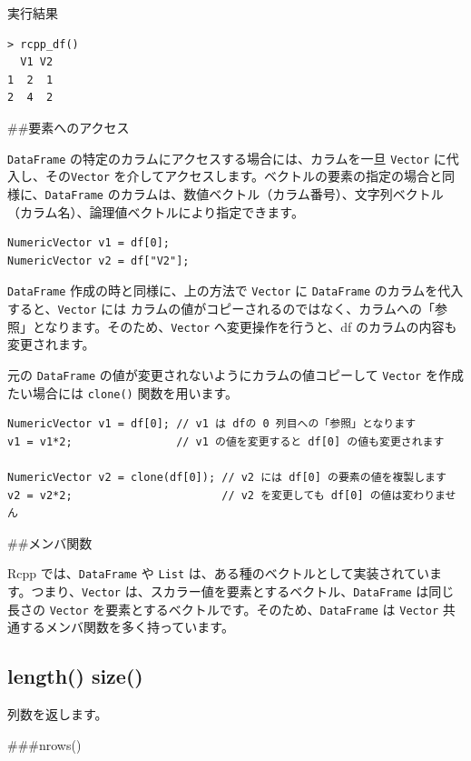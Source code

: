 \documentclass[]{book}
\begin{document}
実行結果

\begin{verbatim}
> rcpp_df()
  V1 V2
1  2  1
2  4  2
\end{verbatim}

\#\#要素へのアクセス

\texttt{DataFrame} の特定のカラムにアクセスする場合には、カラムを一旦 \texttt{Vector} に代入し、その\texttt{Vector} を介してアクセスします。ベクトルの要素の指定の場合と同様に、\texttt{DataFrame} のカラムは、数値ベクトル（カラム番号）、文字列ベクトル（カラム名）、論理値ベクトルにより指定できます。

\begin{verbatim}
NumericVector v1 = df[0];
NumericVector v2 = df["V2"];
\end{verbatim}

\texttt{DataFrame} 作成の時と同様に、上の方法で \texttt{Vector} に \texttt{DataFrame} のカラムを代入すると、\texttt{Vector} には カラムの値がコピーされるのではなく、カラムへの「参照」となります。そのため、\texttt{Vector} へ変更操作を行うと、df のカラムの内容も変更されます。

元の \texttt{DataFrame} の値が変更されないようにカラムの値コピーして \texttt{Vector} を作成たい場合には \texttt{clone()} 関数を用います。

\begin{verbatim}
NumericVector v1 = df[0]; // v1 は dfの 0 列目への「参照」となります
v1 = v1*2;                // v1 の値を変更すると df[0] の値も変更されます

NumericVector v2 = clone(df[0]); // v2 には df[0] の要素の値を複製します
v2 = v2*2;                       // v2 を変更しても df[0] の値は変わりません
\end{verbatim}

\#\#メンバ関数

Rcpp では、\texttt{DataFrame} や \texttt{List} は、ある種のベクトルとして実装されています。つまり、\texttt{Vector} は、スカラー値を要素とするベクトル、\texttt{DataFrame} は同じ長さの \texttt{Vector} を要素とするベクトルです。そのため、\texttt{DataFrame} は \texttt{Vector} 共通するメンバ関数を多く持っています。

\hypertarget{length-size-1}{%
\subsection{length() size()}\label{length-size-1}}

列数を返します。

\#\#\#nrows()
\end{document}
